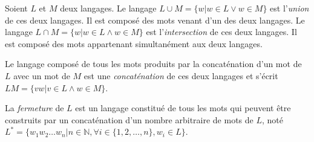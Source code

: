 Soient $L$ et $M$ deux langages. Le langage $L \cup M = \{w | w \in L\vee w \in M\}$ est l'\emph{union} de ces deux langages. Il est composé des mots venant d'un des deux langages. Le langage $L\cap M =\{w | w\in L \wedge w\in M\}$ est l'\emph{intersection} de ces deux langages. Il est composé des mots appartenant simultanément aux deux langages.

Le langage composé de tous les mots produits par la concaténation d'un mot de $L$ avec un mot de $M$ est une \emph{concaténation} de ces deux langages et s'écrit $LM = \{vw | v \in L \wedge w \in M\}$.

La \emph{fermeture} de $L$ est un langage constitué de tous les mots qui peuvent être construits par un concaténation d'un nombre arbitraire de mots de $L$, noté $L^*=\{w_1w_2\dots w_n|n\in \mathbb{N},\forall i \in \{1,2,\dots,n\}, w_i \in L\}$.
